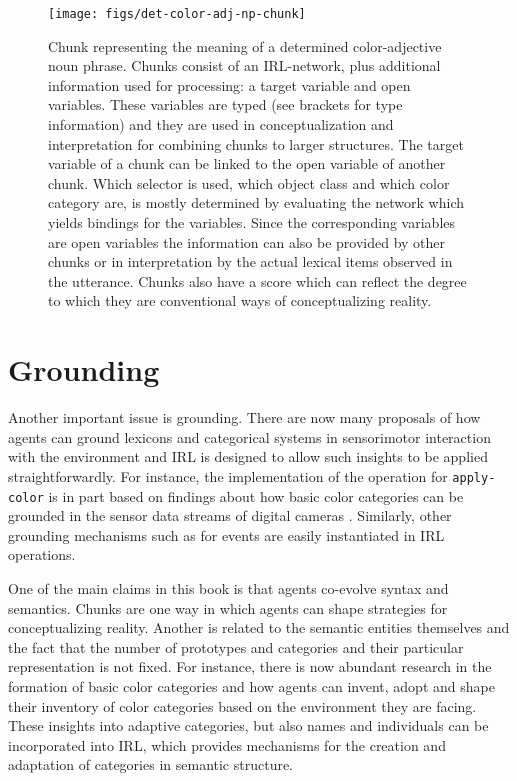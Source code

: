 \begin{figure}
\center
\texttt{[image: figs/det-color-adj-np-chunk]}
\caption[Color-adjective noun phrase chunk]{Chunk representing the 
meaning of a determined color-adjective noun phrase. Chunks consist 
of an IRL-network, plus additional information used for processing: 
a target variable and open variables. These variables are typed 
(see brackets for type information)
and they are used in conceptualization and interpretation for combining chunks
to larger structures. The target variable of a chunk can be linked to the open
variable of another chunk. Which selector is used, 
which object class and which color category are, is mostly
determined by evaluating the network which yields bindings for
the variables. Since the corresponding variables are open variables
the information can also be provided by other chunks or in interpretation
by the actual lexical items observed in the utterance. Chunks also have a score
which can reflect the degree to which they are conventional 
ways of conceptualizing reality.}
\label{f:the-red-block-chunk}
\end{figure}


\section{Grounding}
Another important issue is grounding. 
There are now many proposals of how agents can ground lexicons and 
categorical systems in sensorimotor interaction with the environment 
\citep{billard1998grounding,vogt2001bootstrapping,steels2008grounding} and 
IRL is designed to allow such 
insights to be applied straightforwardly. For instance, the 
implementation of the operation for {\footnotesize\texttt{apply-color}} is in part based on 
findings about how basic color categories can be grounded in the sensor 
data streams of digital cameras \citep{steels2005coordinating,bleys2009grounded}.
Similarly, other grounding mechanisms such as for events 
\citep{siskind2001grounding,steels2003events} are easily instantiated in IRL operations. 

One of the main claims in this book is that agents co-evolve syntax 
and semantics. Chunks are one way in which agents can
shape strategies for conceptualizing reality. Another
is related to the semantic entities themselves and the fact that the
number of prototypes and categories and their particular 
representation is not fixed. For instance, there is now 
abundant research in the formation of basic color categories 
\citep{steels2005coordinating,belpaeme2007language}
and how agents can invent, adopt and shape their inventory
of color categories based on the environment they are
facing. These insights into adaptive categories,
but also names and individuals can be incorporated into
IRL, which provides mechanisms for the creation and
adaptation of categories in semantic structure.


